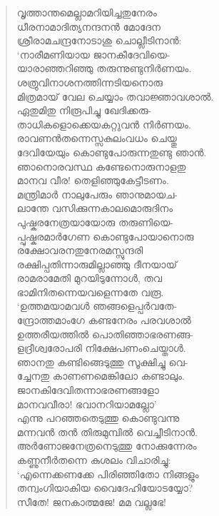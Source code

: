 \begin{verse}
വൃത്താന്തമെല്ലാമറിയിച്ചതുനേരം\\
ധീരനാമാദിത്യനന്ദനന്‍ മോദേന\\
ശ്രീരാമചന്ദ്രനോടാശു ചൊല്ലീടിനാന്‍:\\
‘നാരീമണിയായ ജാനകീദേവിയെ-\\
യാരാഞ്ഞറിഞ്ഞു തരുന്നുണ്ടുനിര്‍ണയം.\\
ശത്രുവിനാശനത്തിന്നടിയനൊരു\\
മിത്രമായ് വേല ചെയ്യാം തവാജ്ഞാവശാല്‍.\\
ഏതുമിതു നിരൂപിച്ചു ഖേദിക്കരു-\\
താധികളൊക്കെയകറ്റുവന്‍ നിര്‍ണയം.\\
രാവണന്‍തന്നെസ്സകുലംവധം ചെയ്തു\\
ദേവിയേയും കൊണ്ടുപോരുന്നതുണ്ടു ഞാന്‍.\\
ഞാനൊരവസ്ഥ കണ്ടേനൊരുനാളതു\\
മാനവ വീര! തെളിഞ്ഞുകേട്ടീടണം.\\
മന്ത്രിമാര്‍ നാലുപേരും ഞാനുമായച-\\
ലാന്തേ വസിക്കുന്നകാലമൊരുദിനം\\
പുഷ്കരനേത്രയായോരു തരുണിയെ-\\
പ്പുഷ്കരമാര്‍ഗേണ കൊണ്ടുപോയാനൊരു\\
രക്ഷോവരനതുനേരമസ്സുന്ദരി\\
രക്ഷിപ്പതിന്നാരുമില്ലാഞ്ഞു ദീനയായ്\\
രാമരാമേതി മുറയിടുന്നോള്‍, തവ\\
ഭാമിനിതന്നെയവളെന്നതേ വരൂ.\\
‘ഉത്തമയാമവള്‍ ഞങ്ങളെപ്പര്‍വതേ-\\
ന്ദ്രോത്തമാംഗേ കണ്ടനേരം പരവശാല്‍\\
ഉത്തരീയത്തില്‍ പൊതിഞ്ഞാഭരണങ്ങ-\\
ളദ്രീശ്വരോപരി നിക്ഷേപണംചെയ്താള്‍.\\
ഞാനതു കണ്ടിങ്ങെടുത്തു സൂക്ഷിച്ചു വെ-\\
ച്ചേനതു കാണണമെങ്കിലോ കണ്ടാലും.\\
ജാനകിദേവിതന്നാഭരണങ്ങളോ\\
മാനവവീരാ! ഭവാനറിയാമല്ലോ’\\
എന്നു പറഞ്ഞതെടുത്തു കൊണ്ടുവന്നു\\
മന്നവന്‍ തന്‍ തിരുമുമ്പില്‍ വെച്ചീടിനാന്‍.\\
അര്‍ണോജനേത്രനെടുത്തു നോക്കുന്നേരം\\
കണ്ണുനീര്‍തന്നെ കുശലം വിചാരിച്ചു:\\
‘എന്നെക്കണക്കേ പിരിഞ്ഞിതോ നിങ്ങളും\\
തന്വംഗിയാകിയ വൈദേഹിയോടയ്യോ?\\
സീതേ! ജനകാത്മജേ! മമ വല്ലഭേ!\\

\end{verse}
